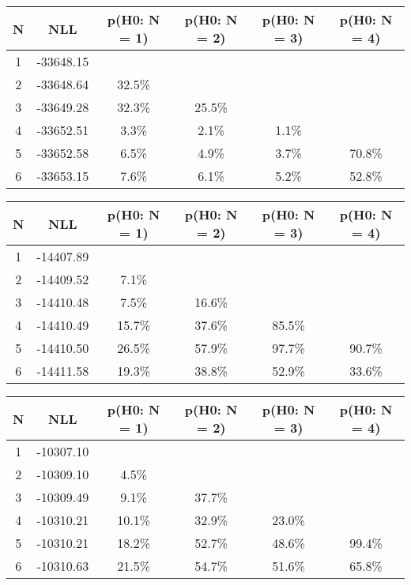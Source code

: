 \begin{table}[htb]
	\begin{center}
{\footnotesize\renewcommand{\arraystretch}{1.4}
		\begin{tabular}{cc||cccc}
			N & NLL & p(H0: N = 1) & p(H0: N = 2) & p(H0: N = 3) & p(H0: N = 4)\\ 
		\hline
1 & -33648.15 & & & & \\
2 & -33648.64 & 32.5\% & & & \\
3 & -33649.28 & 32.3\% & 25.5\% & & \\
4 & -33652.51 & 3.3\% & 2.1\% & 1.1\% & \\
5 & -33652.58 & 6.5\% & 4.9\% & 3.7\% & 70.8\% \\
6 & -33653.15 & 7.6\% & 6.1\% & 5.2\% & 52.8\% \\
	\end{tabular}
		\label{tab:lab}
	}
	\end{center}\end{table}

\begin{table}[htb]
	\begin{center}
{\footnotesize\renewcommand{\arraystretch}{1.4}
		\begin{tabular}{cc||cccc}
			N & NLL & p(H0: N = 1) & p(H0: N = 2) & p(H0: N = 3) & p(H0: N = 4)\\ 
		\hline
1 & -14407.89 & & & & \\
2 & -14409.52 & 7.1\% & & & \\
3 & -14410.48 & 7.5\% & 16.6\% & & \\
4 & -14410.49 & 15.7\% & 37.6\% & 85.5\% & \\
5 & -14410.50 & 26.5\% & 57.9\% & 97.7\% & 90.7\% \\
6 & -14411.58 & 19.3\% & 38.8\% & 52.9\% & 33.6\% \\
	\end{tabular}
		\label{tab:lab}
	}
	\end{center}\end{table}

\begin{table}[htb]
	\begin{center}
{\footnotesize\renewcommand{\arraystretch}{1.4}
		\begin{tabular}{cc||cccc}
			N & NLL & p(H0: N = 1) & p(H0: N = 2) & p(H0: N = 3) & p(H0: N = 4)\\ 
		\hline
1 & -10307.10 & & & & \\
2 & -10309.10 & 4.5\% & & & \\
3 & -10309.49 & 9.1\% & 37.7\% & & \\
4 & -10310.21 & 10.1\% & 32.9\% & 23.0\% & \\
5 & -10310.21 & 18.2\% & 52.7\% & 48.6\% & 99.4\% \\
6 & -10310.63 & 21.5\% & 54.7\% & 51.6\% & 65.8\% \\
	\end{tabular}
		\label{tab:lab}
	}
	\end{center}\end{table}


